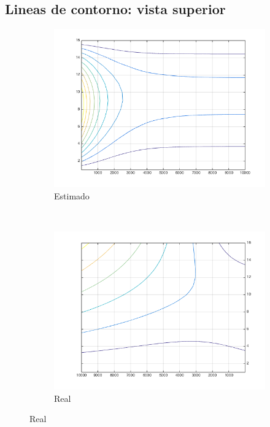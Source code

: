 \documentclass[12pt,letterpaper]{article}
\begin{document}
\subsection{Lineas de contorno: vista superior}
\begin{figure}[!h]
        \centering
        \begin{subfigure}[h]{0.45\textwidth}
                \includegraphics[width=\textwidth]{estimado_arriba}
                \caption{Estimado}
                \label{fig:gull}
        \end{subfigure}
        ~
        \begin{subfigure}[h]{0.45\textwidth}
                \includegraphics[width=\textwidth]{real_arriba}
                \caption{Real}
                \label{fig:tiger}
        \end{subfigure}
\end{figure}
\end{document}

